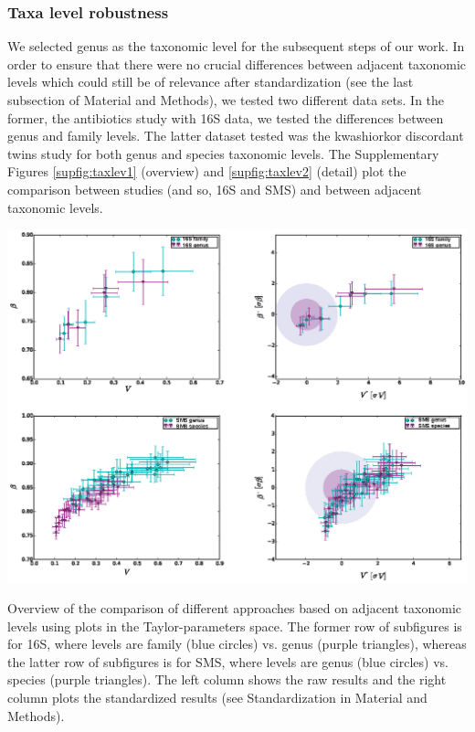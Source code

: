 \subsubsection*{Taxa level robustness}
We selected genus as the taxonomic level for the subsequent steps of our work. In order to ensure that there were no crucial differences between adjacent taxonomic levels which could still be of relevance after standardization (see the last subsection of Material and Methods), we tested two different data sets. In the former, the antibiotics study\cite{antibiotic} with 16S data, we tested the differences between genus and family levels. The latter dataset tested was the kwashiorkor discordant twins study\cite{kwashiorkor} for both genus and species taxonomic levels. The Supplementary Figures \ref{supfig:taxlev1} (overview) and \ref{supfig:taxlev2} (detail) plot the comparison between studies (and so, 16S and SMS) and between adjacent taxonomic levels.

\begin{supfig} 
  \includegraphics[width=1.0\textwidth]{figs/supfig_taxlev1.eps}
\caption{Overview of the comparison of different approaches based on adjacent taxonomic levels using plots in the Taylor-parameters space. The former row of subfigures is for 16S, where levels are family (blue circles) vs. genus (purple triangles), whereas the latter row of subfigures is for SMS, where levels are genus (blue circles) vs. species (purple triangles). The left column shows the raw results and the right column plots the standardized results (see Standardization in Material and Methods).}
\label{supfig:taxlev1}
\end{supfig}

